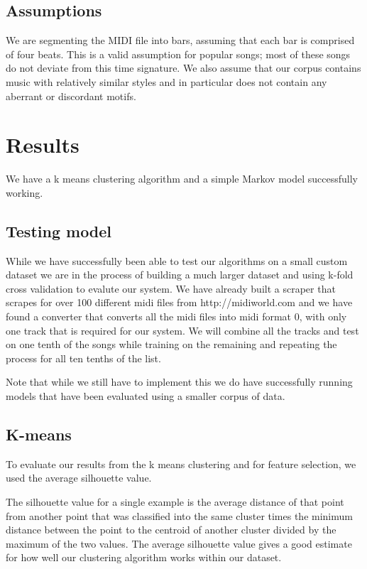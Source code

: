 \documentclass[a4paper, 12pt]{article}
\begin{document}
\subsection{Assumptions}

We are segmenting the MIDI file into bars, assuming that each bar is comprised of four beats. This is a valid assumption for popular songs; most of these songs do not deviate from this time signature. We also assume that our corpus contains music with relatively similar styles and in particular does not contain any aberrant or discordant motifs.

\section{Results}

We have a k means clustering algorithm and a simple Markov model successfully working. 

\subsection{Testing model}
While we have successfully been able to test our algorithms on a small custom dataset we are in the process of building a much larger dataset and using k-fold cross validation to evalute our system. We have already built a scraper that scrapes for over 100 different midi files from http://midiworld.com and we have found a converter that converts all the midi files into midi format 0, with only one track that is required for our system. We will combine all the tracks and test on one tenth of the songs while training on the remaining and repeating the process for all ten tenths of the list.

Note that while we still have to implement this we do have successfully running models that have been evaluated using a smaller corpus of data.

\subsection{K-means}
To evaluate our results from the k means clustering and for feature selection, we used the average silhouette value. 

The silhouette value for a single example is the average distance of that point from another point that was classified into the same cluster times the minimum distance between the point to the centroid of another cluster divided by the maximum of the two values. The average silhouette value gives a good estimate for how well our clustering algorithm works within our dataset.
\end{document}
